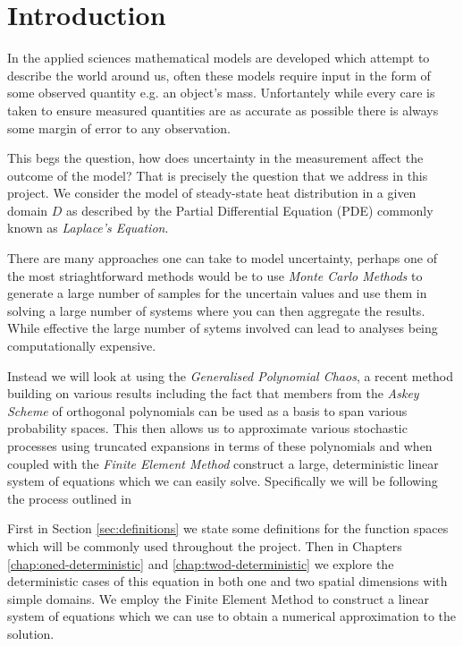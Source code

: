 \chapter{Introduction}

In the applied sciences mathematical models are developed which attempt to
describe the world around us, often these models require input in the form of
some observed quantity e.g. an object's mass. Unfortantely while every care is
taken to ensure measured quantities are as accurate as possible there is always
some margin of error to any observation.

This begs the question, how does uncertainty in the measurement affect the
outcome of the model? That is precisely the question that we address in this
project. We consider the model of steady-state heat distribution in a given
domain $D$ as described by the Partial Differential Equation (PDE) commonly
known as \textit{Laplace's Equation}.

There are many approaches one can take to model uncertainty, perhaps one of the
most striaghtforward methods would be to use \textit{Monte Carlo Methods} to
generate a large number of samples for the uncertain values and use them in
solving a large number of systems where you can then aggregate the results.
While effective the large number of sytems involved can lead to analyses being
computationally expensive.

Instead we will look at using the \textit{Generalised Polynomial Chaos}, a
recent method building on various results including the fact that members from
the \textit{Askey Scheme} of orthogonal polynomials can be used as a basis to
span various probability spaces. This then allows us to approximate various
stochastic processes using truncated expansions in terms of these polynomials
and when coupled with the \textit{Finite Element Method} construct a large,
deterministic linear system of equations which we can easily solve.
Specifically we will be following the process outlined in
\cite{general-poly-chaos}

First in Section \ref{sec:definitions} we state some definitions for the function
spaces which will be commonly used throughout the project. Then in Chapters
\ref{chap:oned-deterministic} and \ref{chap:twod-deterministic} we explore the
deterministic cases of this equation in both one and two spatial dimensions
with simple domains. We employ the Finite Element Method to construct a linear
system of equations which we can use to obtain a numerical approximation to the
solution.

